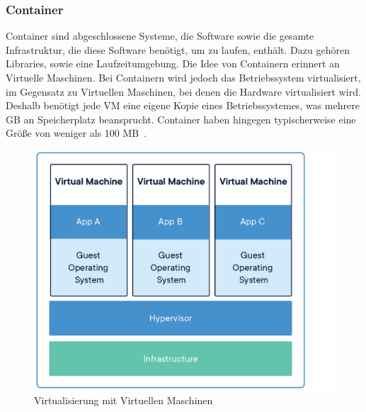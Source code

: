 \subsubsection{Container}
 Container sind abgeschlossene Systeme, die Software sowie die gesamte Infrastruktur, die diese Software
 benötigt, um zu laufen, enthält.
 Dazu gehören Libraries, sowie eine Laufzeitumgebung.
 Die Idee von Containern erinnert an Virtuelle Maschinen.
 Bei Containern wird jedoch das Betriebssystem virtualisiert, im Gegensatz zu Virtuellen Maschinen,
 bei denen die Hardware virtualisiert wird.
 Deshalb benötigt jede VM eine eigene Kopie eines Betriebssystemes, was mehrere GB an Speicherplatz beansprucht.
 Container haben hingegen typischerweise eine Größe von weniger als 100 MB~\cite{docker-container}.

 \begin{figure}[hbt!]
     \centering
     \includegraphics[scale=0.2]{pics/docker-vm.png}
     \caption{Virtualisierung mit Virtuellen Maschinen}
 \end{figure}

